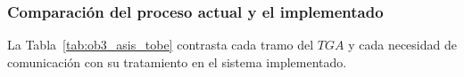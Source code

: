 
\subsubsection{Comparación del proceso actual y el implementado}

La Tabla~\ref{tab:ob3_asis_tobe} contrasta cada tramo del $TGA$ y cada necesidad de comunicación con su tratamiento en el sistema implementado.

\begingroup
\fontsize{9}{11}\selectfont
\renewcommand{\arraystretch}{1.2}
\setlength{\LTpre}{0pt}\setlength{\LTpost}{6pt}
\setlength{\tabcolsep}{4pt}
